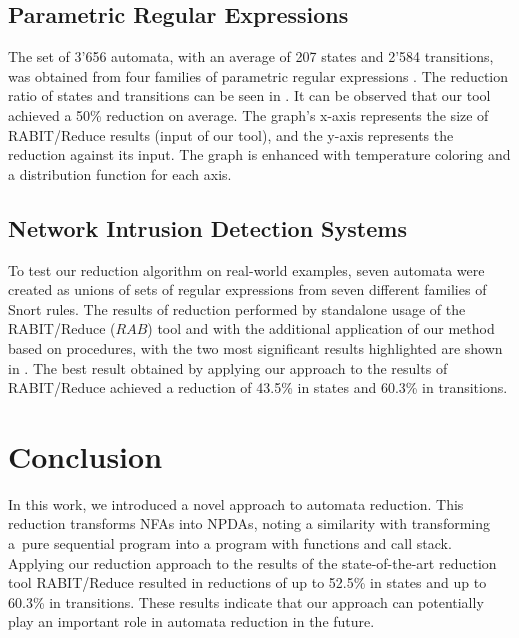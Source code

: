 \documentclass{ExcelAtFIT}
\begin{document}
	\subsection{Parametric Regular Expressions}
		The set of 3'656 automata, with an average of 207 states and 2'584 transitions, was obtained from four families of parametric regular expressions \cite{Regex_param}. The reduction ratio of states and transitions can be seen in . It can be observed that our tool achieved a 50\% reduction on average. The graph's x-axis represents the size of RABIT/Reduce results (input of our tool), and the y-axis represents the reduction against its input. The graph is enhanced with temperature coloring and a distribution function for each axis.

	\subsection{Network Intrusion Detection Systems}
		To test our reduction algorithm on real-world examples, seven automata were created as unions of sets of regular expressions from seven different families of Snort rules. The results of reduction performed by standalone usage of the RABIT/Reduce ($RAB$) tool and with the additional application of our method based on procedures, with the two most significant results highlighted are shown in . The best result obtained by applying our approach to the results of RABIT/Reduce achieved a reduction of 43.5\% in states and 60.3\% in transitions.

\section{Conclusion}
	In this work, we introduced a novel approach to automata reduction. This reduction transforms NFAs into NPDAs, noting a similarity with transforming a~pure sequential program into a program with functions and call stack. Applying our reduction approach to the results of the state-of-the-art reduction tool RABIT/Reduce resulted in reductions of up to 52.5\% in states and up to 60.3\% in transitions. These results indicate that our approach can potentially play an important role in automata reduction in the future.






\end{document}
